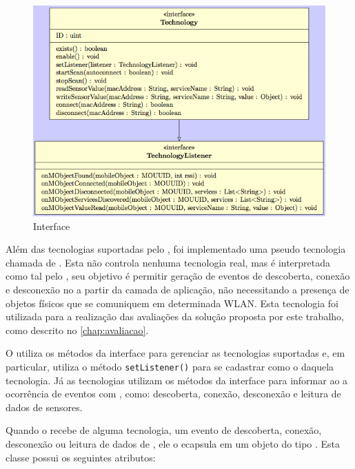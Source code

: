 \begin{figure}[htb]
	\centering
	\caption{\label{fig:technology-interface}Interface \techinterface}
	\includegraphics[width=0.85\linewidth]{img/technology-interface.png}
\end{figure}

Além das tecnologias suportadas pelo \mhub, foi implementado uma pseudo tecnologia chamada de \faketechnology.
Esta não controla nenhuma tecnologia real, mas é interpretada como tal pelo \stwopa, seu objetivo é permitir geração de eventos de descoberta, conexão e desconexão no \stwopa a partir da camada de aplicação, não necessitando a presença de objetos físicos que se comuniquem em determinada WLAN.
Esta tecnologia foi utilizada para a realização das avaliações da solução proposta por este trabalho, como descrito no \autoref{chap:avaliacao}.

O \stwopaservice utiliza os métodos da interface \techinterface para gerenciar as tecnologias suportadas e, em particular, utiliza o método \texttt{setListener()} para se cadastrar como o \listener daquela tecnologia. Já as tecnologias utilizam os métodos da interface \techlistener para informar ao \stwopaservice a ocorrência de eventos com \smartobjs, como: descoberta, conexão, desconexão e leitura de dados de sensores.

Quando o \stwopaservice recebe de alguma tecnologia, um evento de descoberta, conexão, desconexão ou leitura de dados de \smartobjs, ele o ecapsula em um objeto do tipo \sensordata.
Esta classe possui os seguintes atributos:

